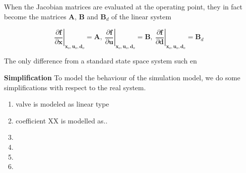 %

When the Jacobian matrices are evaluated at the operating point, they in fact become the matrices $ \textbf{A} $, $ \textbf{B} $ and $ \textbf{B}_d  $ of the linear system

\begin{equation}
	\left. \dfrac{\partial \textbf{f}}{\partial \textbf{x}} \right |_{\textbf{x}_o, \textbf{u}_o, \textbf{d}_o} = \textbf{A}, \
	\left. \dfrac{\partial \textbf{f}}{\partial \textbf{u}} \right |_{\textbf{x}_o, \textbf{u}_o, \textbf{d}_o} = \textbf{B}, \
	\left. \dfrac{\partial \textbf{f}}{\partial \textbf{d}} \right |_{\textbf{x}_o, \textbf{u}_o, \textbf{d}_o} = \textbf{B}_d
\end{equation}

The only difference from a standard state space system such en

\textbf{Simplification}
To model the behaviour of the simulation model, we do some simplifications with respect to the real system.
\begin{enumerate}
	\item valve is modeled as linear type
	\item coefficient XX is modelled as..
	\item
	\item
	\item
	\item

\end{enumerate}